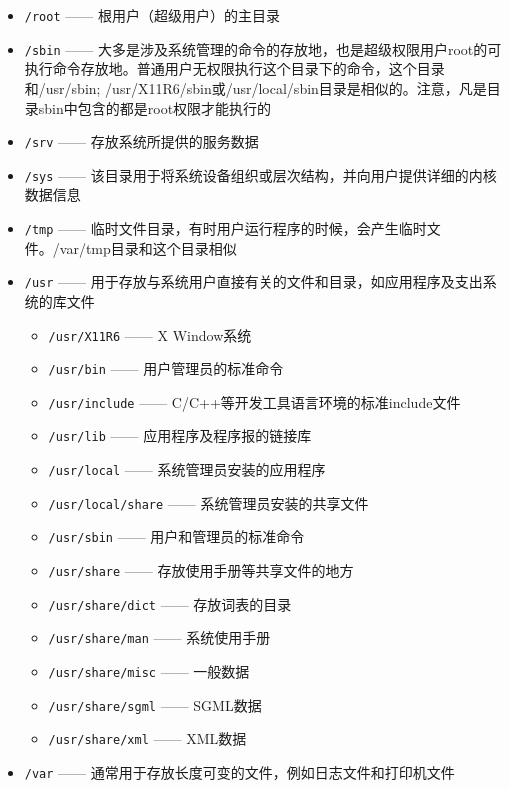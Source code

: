 \documentclass[doctor,openright,twoside]{sjtuthesis}
\providecommand{\tightlist}{%
    \setlength{\itemsep}{0pt}\setlength{\parskip}{0pt}}
\newcommand{\passthrough}[1]{#1}
\theoremstyle{plain}
\theoremstyle{definition}
\theoremstyle{remark}
\theoremstyle{ocrenumbox}
\theoremstyle{plain}
\begin{document}
\begin{itemize}
\item
  \passthrough{\lstinline!/root!} ------ 根用户（超级用户）的主目录
\item
  \passthrough{\lstinline!/sbin!} ------
  大多是涉及系统管理的命令的存放地，也是超级权限用户root的可执行命令存放地。普通用户无权限执行这个目录下的命令，这个目录和/usr/sbin;
  /usr/X11R6/sbin或/usr/local/sbin目录是相似的。注意，凡是目录sbin中包含的都是root权限才能执行的
\item
  \passthrough{\lstinline!/srv!} ------ 存放系统所提供的服务数据
\item
  \passthrough{\lstinline!/sys!} ------
  该目录用于将系统设备组织或层次结构，并向用户提供详细的内核数据信息
\item
  \passthrough{\lstinline!/tmp!} ------
  临时文件目录，有时用户运行程序的时候，会产生临时文件。/var/tmp目录和这个目录相似
\item
  \passthrough{\lstinline!/usr!} ------
  用于存放与系统用户直接有关的文件和目录，如应用程序及支出系统的库文件

  \begin{itemize}
  \tightlist
  \item
    \passthrough{\lstinline!/usr/X11R6!} ------ X Window系统
  \item
    \passthrough{\lstinline!/usr/bin!} ------ 用户管理员的标准命令
  \item
    \passthrough{\lstinline!/usr/include!} ------
    C/C++等开发工具语言环境的标准include文件
  \item
    \passthrough{\lstinline!/usr/lib!} ------ 应用程序及程序报的链接库
  \item
    \passthrough{\lstinline!/usr/local!} ------ 系统管理员安装的应用程序
  \item
    \passthrough{\lstinline!/usr/local/share!} ------
    系统管理员安装的共享文件
  \item
    \passthrough{\lstinline!/usr/sbin!} ------ 用户和管理员的标准命令
  \item
    \passthrough{\lstinline!/usr/share!} ------
    存放使用手册等共享文件的地方
  \item
    \passthrough{\lstinline!/usr/share/dict!} ------ 存放词表的目录
  \item
    \passthrough{\lstinline!/usr/share/man!} ------ 系统使用手册
  \item
    \passthrough{\lstinline!/usr/share/misc!} ------ 一般数据
  \item
    \passthrough{\lstinline!/usr/share/sgml!} ------ SGML数据
  \item
    \passthrough{\lstinline!/usr/share/xml!} ------ XML数据
  \end{itemize}
\item
  \passthrough{\lstinline!/var!} ------
  通常用于存放长度可变的文件，例如日志文件和打印机文件


\end{itemize}
\end{document}

